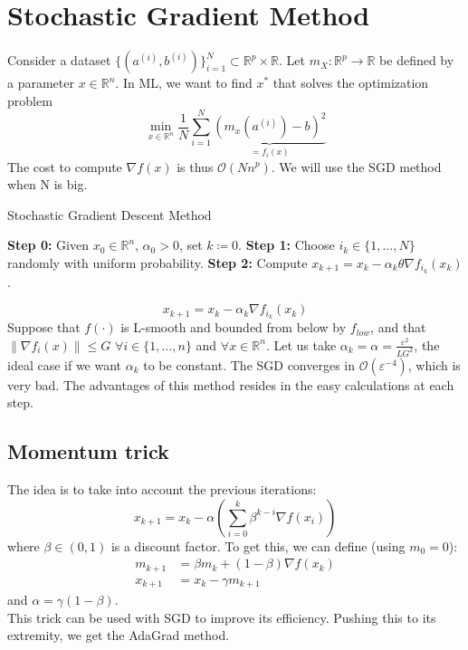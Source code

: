 \documentclass[12pt, openany]{report}
\newcommand{\R}{\mathbb{R}}
\theoremstyle{definition}
\begin{document}
\section{Stochastic Gradient Method}
Consider a dataset \(\{(a^{(i)},b^{(i)})\}_{i=1}^N\subset \R^p\times \R\). Let \(m_X:\R^p\rightarrow \R\) be defined by a parameter \(x\in \R^n\). In ML, we want to find \(x^*\) that solves the optimization problem
\begin{equation}
    \min_{x\in \R^n}\frac{1}{N}\sum_{i=1}^N \underbrace{\left(m_x\left(a^{(i)}\right)-b\right)^2}_{=f_i(x)}
\end{equation}
The cost to compute \(\nabla f(x)\) is thus \(\mathcal{O}(Nn^p)\). We will use the SGD method when N is big.
\begin{algorithm}\label{algo:SGD}
    \caption{Stochastic Gradient Descent Method}
    \begin{algorithmic}[1]
        \State \textbf{Step 0:} Given \(x_0\in \R^n\), \(\alpha_0>0\), set \(k\coloneqq 0\).
        \State \textbf{Step 1:} Choose \(i_k\in \{1,\dots,N\}\) randomly with uniform probability.
        \State \textbf{Step 2:} Compute \(x_{k+1}=x_k-\alpha_k \theta \nabla f_{i_k}(x_k)\).
    \end{algorithmic}
\end{algorithm}
\begin{equation}
    x_{k+1} = x_k-\alpha_k \nabla f_{i_k}(x_k)
\end{equation}
Suppose that $f(\cdot)$ is L-smooth and bounded from below by $f_{low}$, and that $\lVert \nabla f_i(x)\rVert \le G$ $\forall i\in \{1,\dots,n\}$ and $\forall x \in \R^n$. Let us take $\alpha_k = \alpha = \frac{\varepsilon^2}{LG^2}$, the ideal case if we want $\alpha_k$ to be constant. The SGD converges in $\mathcal{O}(\varepsilon^{-4})$, which is very bad. The advantages of this method resides in the easy calculations at each step. 
\subsection{Momentum trick}
The idea is to take into account the previous iterations:
\begin{equation}
    x_{k+1} = x_k - \alpha \left(\sum_{i=0}^k \beta^{k-i}\nabla f(x_i)\right)
\end{equation}
where $\beta \in (0,1)$ is a discount factor. To get this, we can define (using $m_0=0$):
\begin{align}
    m_{k+1}&=\beta m_k + (1-\beta)\nabla f(x_k)\nonumber\\
    x_{k+1}&= x_k - \gamma m_{k+1}
\end{align}
and $\alpha = \gamma(1-\beta)$.\\
This trick can be used with SGD to improve its efficiency. Pushing this to its extremity, we get the AdaGrad method.
\end{document}
